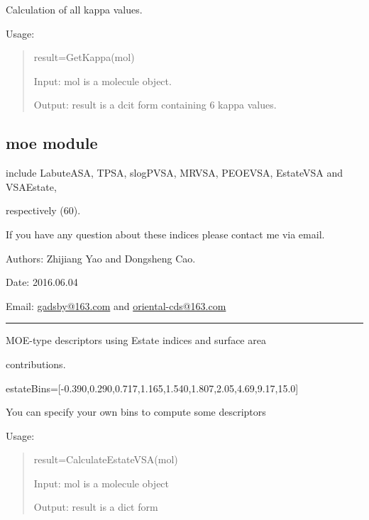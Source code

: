 \documentclass[letterpaper,10pt,english]{sphinxmanual}
\begin{document}

\begin{fulllineitems}
\label{reference/kappa:kappa.GetKappa}
Calculation of all kappa values.

Usage:
\begin{quote}

result=GetKappa(mol)

Input: mol is a molecule object.

Output: result is a dcit form containing 6 kappa values.
\end{quote}

\end{fulllineitems}



\subsection{moe module}
\label{reference/moe:module-moe}\label{reference/moe::doc}\label{reference/moe:moe-module}
include LabuteASA, TPSA, slogPVSA, MRVSA, PEOEVSA, EstateVSA and VSAEstate,

respectively (60).

If you have any question about these indices please contact me via email.

Authors: Zhijiang Yao and Dongsheng Cao.

Date: 2016.06.04

Email: \href{mailto:gadsby@163.com}{gadsby@163.com} and \href{mailto:oriental-cds@163.com}{oriental-cds@163.com}


\bigskip\hrule{}\bigskip


\begin{fulllineitems}
\label{reference/moe:moe.CalculateEstateVSA}
MOE-type descriptors using Estate indices and surface area

contributions.

estateBins={[}-0.390,0.290,0.717,1.165,1.540,1.807,2.05,4.69,9.17,15.0{]}

You can specify your own bins to compute some descriptors

Usage:
\begin{quote}

result=CalculateEstateVSA(mol)

Input: mol is a molecule object

Output: result is a dict form
\end{quote}

\end{fulllineitems}
\end{document}

